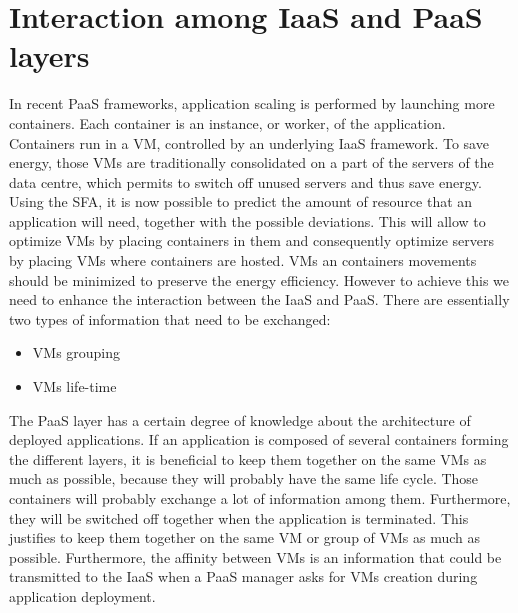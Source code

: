 
\section{Interaction among IaaS and PaaS layers}
\label{sec:iaaspaas}

In recent PaaS frameworks, application scaling is performed by launching more containers.
Each container is an instance, or worker, of the application.
Containers run in a VM, controlled by an underlying IaaS framework.
To save energy, those VMs are traditionally consolidated on a part of the servers of the data centre, which permits to switch off unused servers and thus save energy.
Using the SFA, it is now possible to predict the amount of resource that an application will need, together with the possible deviations.
This will allow to optimize VMs by placing containers in them and consequently optimize servers by placing VMs where containers are hosted.
VMs an containers movements should be minimized to preserve the energy efficiency.
However to achieve this we need to enhance the interaction between the IaaS and PaaS.
There are essentially two types of information that need to be exchanged:
\begin{itemize}
  \item VMs grouping
  \item VMs life-time
\end{itemize}

The PaaS layer has a certain degree of knowledge about the architecture of deployed applications.
If an application is composed of several containers forming the different layers, it is beneficial to keep them together on the same VMs as much as possible, because they will probably have the same life cycle.
Those containers will probably exchange a lot of information among them.
Furthermore, they will be switched off together when the application is terminated.
This justifies to keep them together on the same VM or group of VMs as much as possible.
Furthermore, the affinity between VMs is an information that could be transmitted to the IaaS when a PaaS manager asks for VMs creation during application deployment.

